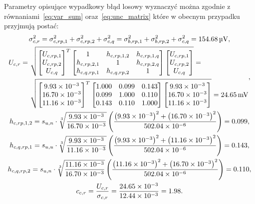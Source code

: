 Parametry opisujące wypadkowy błąd losowy wyznaczyć można zgodnie z równaniami~\eqref{eq:var_sum} oraz~\eqref{eq:unc_matrix} które w obecnym przypadku przyjmują postać:
\begin{gather}
\sigma_{c,r}^{2} = \sigma_{c,rp,1}^{2} + \sigma_{c,rp,2}^{2} + \sigma_{c,q}^{2} = \sigma_{b,rp,1}^{2} + \sigma_{b,rp,2}^{2} + \sigma_{c,q}^{2} = \qty{154.68}{\micro V} \label{eq:sym_partc_rand_var}, \\
\begin{split}
U_{c,r} = ~ & \sqrt{
\begin{bmatrix}
U_{c,rp,1} \\ U_{c,rp,2} \\ U_{c,q}
\end{bmatrix}^{T}
\begin{bmatrix}
1            & h_{c,rp,1,2} & h_{c,rp,1,q} \\
h_{c,rp,2,1} & 1            & h_{c,rp,2,q} \\
h_{c,q,rp,1} & h_{c,q,rp,2} & 1
\end{bmatrix}
\begin{bmatrix}
U_{c,rp,1} \\ U_{c,rp,2} \\ U_{c,q}
\end{bmatrix}} = ~ \\ & \sqrt{
\begin{bmatrix}
\num{9.93e-3} \\ \num{16.70e-3} \\ \num{11.16e-3}
\end{bmatrix}^{T}
\begin{bmatrix}
1.000 & 0.099 & 0.143 \\
0.099 & 1.000 & 0.110 \\
0.143 & 0.110 & 1.000
\end{bmatrix}
\begin{bmatrix}
\num{9.93e-3} \\ \num{16.70e-3} \\ \num{11.16e-3}
\end{bmatrix}} = \qty{24.65}{mV}
\end{split}
\label{eq:sym_partc_rand_uncert}, \\
h_{c,rp,1,2} = s_{u,n} \cdot \sqrt[3]{\frac{\num{9.93e-3}}{\num{16.70e-3}}} \left( \frac{\left(\num{9.93e-3}\right)^{2} + \left(\num{16.70e-3}\right)^{2}}{\num{502.04e-6}} \right) = 0.099 \label{eq:sym_partc_coher_rp_1_2}, \\
h_{c,q,rp,1} = s_{u,u} \cdot \sqrt[3]{\frac{\num{9.93e-3}}{\num{11.16e-3}}} \left( \frac{\left(\num{9.93e-3}\right)^{2} + \left(\num{11.16e-3}\right)^{2}}{\num{502.04e-6}} \right) = 0.143 \label{eq:sym_partc_coher_q_rp_1}, \\
h_{c,q,rp,2} = s_{u,n} \cdot \sqrt[3]{\frac{\num{11.16e-3}}{\num{16.70e-3}}} \left( \frac{\left(\num{11.16e-3}\right)^{2} + \left(\num{16.70e-3}\right)^{2}}{\num{502.04e-6}} \right) = 0.110 \label{eq:sym_partc_coher_q_rp_2}, \\
c_{c,r} = \frac{U_{c,r}}{\sigma_{c,r}} = \frac{\num{24.65e-3}}{\num{12.44e-3}} = 1.98 \label{eq:sym_partc_rand_factor}.
\end{gather}

